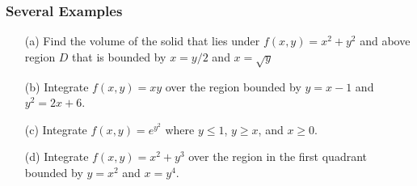 \documentclass{beamer}
\begin{document}
\begin{frame}
\frametitle{Several Examples}

\begin{itemize}
	\item[(a)] Find the volume of the solid that lies under $f(x,y) = x^2+y^2$ and above region $D$ that is bounded by $x=y/2$ and $x=\sqrt{y}$
	\item[(b)] Integrate $f(x,y)=xy$ over the region bounded by $y=x-1$ and $y^2=2x+6$.
	\item[(c)] Integrate $f(x,y) = e^{y^2}$ where $y\leq1$, $y\geq x$, and $x\geq0$.
	\item[(d)] Integrate $f(x,y)=x^2+y^3$ over the region in the first quadrant bounded by $y=x^2$ and $x=y^4$.
\end{itemize}
\end{frame}
\end{document}
